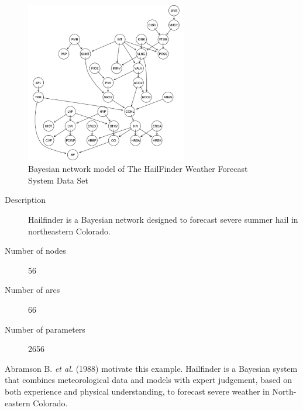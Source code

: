 	\begin{figure}[h]
	\centering
		\includegraphics[height=200pt]{Real_Halifinder}
		\caption{Bayesian network model of The HailFinder Weather Forecast System Data Set}
	\end{figure}	

\begin{description}
	\item[Description] Hailfinder is a Bayesian network designed to forecast severe summer hail in northeastern Colorado.

	\item[Number of nodes] 56
	
	\item[Number of arcs] 66
	
	\item[Number of parameters] 2656
\end{description}

Abramson B. \emph{et al.} (1988) motivate this example. Hailfinder is a Bayesian system that combines meteorological data and models with expert judgement, based on both experience and physical understanding, to forecast severe weather in North-eastern Colorado.

